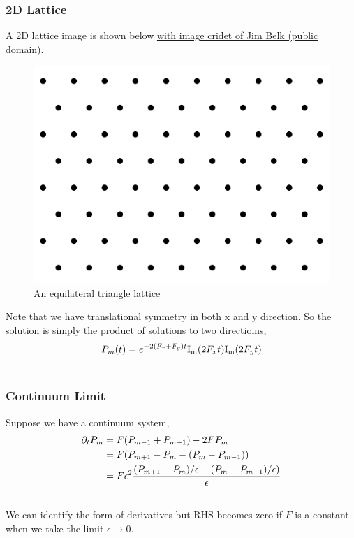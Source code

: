 \documentclass[letterpaper,10pt,english]{sphinxmanual}
\begin{document}
\subsubsection{2D Lattice}
\label{nonequilibrium/week10:d-lattice}
A 2D lattice image is shown below \href{https://commons.wikimedia.org/wiki/File:Equilateral\_Triangle\_Lattice.svg}{with image cridet of Jim Belk (public domain)}.
\begin{figure}[htbp]
\centering
\capstart

\includegraphics{equilateralTriangleLattice.png}
\caption{An equilateral triangle lattice}\end{figure}

Note that we have translational symmetry in both x and y direction. So the solution is simply the product of solutions to two directioins,
\begin{gather}
\begin{split}P_m(t) = e^{-2(F_x+F_y)t} \mathrm{I_m}(2F_xt) \mathrm{I_m}(2F_y t)\end{split}\notag\\\begin{split}\end{split}\notag
\end{gather}

\subsubsection{Continuum Limit}
\label{nonequilibrium/week10:continuum-limit}
Suppose we have a continuum system,
\begin{gather}
\begin{split}\partial_t P_m &= F(P_{m-1} + P_{m+1}) - 2FP_m \\
& = F(P_{m+1}-P_m -(P_m-P_{m-1})) \\
& = F \epsilon^2 \frac{ (P_{m+1}-P_m)/\epsilon -(P_m-P_{m-1})/\epsilon )  }{\epsilon}\end{split}\notag\\\begin{split}\end{split}\notag
\end{gather}
We can identify the form of derivatives but RHS becomes zero if $F$ is a constant when we take the limit $\epsilon \rightarrow 0$.
\end{document}
